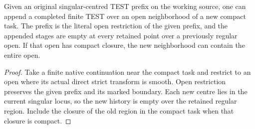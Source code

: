 \begin{proposition}
\label{hir:g8-protected-compact-append}
\leanok
Given an original singular-centred TEST prefix on the working
source, one can append a completed finite TEST over an open
neighborhood of a new compact task. The prefix is the literal
open restriction of the given prefix, and the appended stages
are empty at every retained point over a previously regular
open. If that open has compact closure, the new neighborhood
can contain the entire open.
\end{proposition}
\begin{proof}
Take a finite native continuation near the compact task and
restrict to an open where its actual direct strict transform is
smooth. Open restriction preserves the given prefix and its
marked boundary. Each new centre lies in the current singular
locus, so the new history is empty over the retained regular
region. Include the closure of the old region in the compact
task when that closure is compact.
\end{proof}

